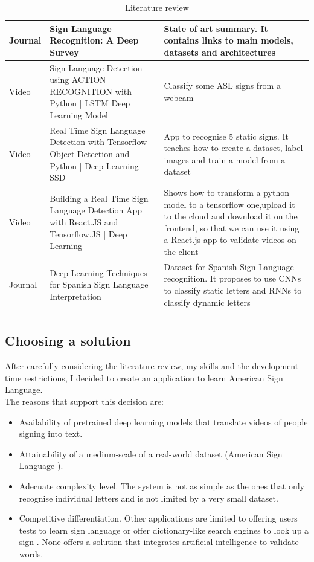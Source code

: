 \begin{longtable}{|p{3cm}|p{4cm}|p{6cm}|}
    \hline Journal & Sign Language Recognition: A Deep Survey \cite{Rastgoo2021} & State of art summary. It contains links to main models, datasets and architectures \\
    \hline Video   & Sign Language Detection using ACTION RECOGNITION with Python | LSTM Deep Learning Model \cite{SignLanguageRecognitionUsingActionRecognition} & Classify some ASL signs from a webcam \\
    \hline Video   & Real Time Sign Language Detection with Tensorflow Object Detection and Python | Deep Learning SSD \cite{SignLanguageRecognitionUsingObjectDetection} & App to recognise 5 static signs. It teaches how to create a dataset, label images and train a model from a dataset \\
    \hline Video   & Building a Real Time Sign Language Detection App with React.JS and Tensorflow.JS | Deep Learning \cite{SignLanguageRecognitionUsingReactjsAndTensorflow} & Shows how to transform a python model to a tensorflow one,upload it to the cloud and download it on the frontend, so that we can use it using a React.js app to validate videos on the client \\
    \hline Journal & Deep Learning Techniques for Spanish Sign Language Interpretation \cite{SpanishDataset2021} & Dataset for Spanish Sign Language recognition. It proposes to use CNNs to classify static letters and RNNs to classify dynamic letters \\
    \hline
    \caption{Literature review}
    \label{table:introduction_literature_review}
\end{longtable}

\subsection{Choosing a solution}
After carefully considering the literature review, my skills and the development time restrictions, I decided to create an application to learn American Sign Language. \\

The reasons that support this decision are:

\begin{itemize}[noitemsep]
    \item Availability of pretrained deep learning models that translate videos of people signing into text.
    \item Attainability of a medium-scale of a real-world dataset (American Sign Language \cite{Li2019}).
    \item Adecuate complexity level. The system is not as simple as the ones that only recognise individual letters and is not limited by a very small dataset.
    \item Competitive differentiation. Other applications are limited to offering users tests to learn sign language \cite{ASLPocket} \cite{Lingvano} or offer dictionary-like search engines to look up a sign \cite{TheASLApp} \cite{LSAmerica}. None offers a solution that integrates artificial intelligence to validate words.
\end{itemize}

